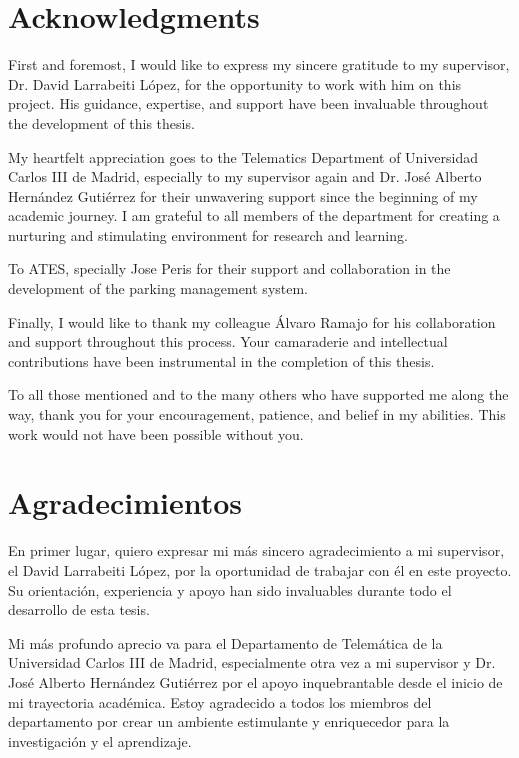 \documentclass[oneside, 12pt, a4paper]{book}
\begin{document}
\blankpage%

\chapter*{Acknowledgments}
\begingroup
\let\clearpage\relax %

First and foremost, I would like to express my sincere gratitude to my supervisor, Dr. David Larrabeiti López, for the opportunity to work with him on this project. His guidance, expertise, and support have been invaluable throughout the development of this thesis.

My heartfelt appreciation goes to the Telematics Department of Universidad Carlos III de Madrid, especially to my supervisor again and Dr. José Alberto Hernández Gutiérrez for their unwavering support since the beginning of my academic journey. I am grateful to all members of the department for creating a nurturing and stimulating environment for research and learning.

To ATES, specially Jose Peris for their support and collaboration in the development of the parking management system.

Finally, I would like to thank my colleague Álvaro Ramajo for his collaboration and support throughout this process. Your camaraderie and intellectual contributions have been instrumental in the completion of this thesis.

To all those mentioned and to the many others who have supported me along the way, thank you for your encouragement, patience, and belief in my abilities. This work would not have been possible without you.

\chapter*{Agradecimientos}

En primer lugar, quiero expresar mi más sincero agradecimiento a mi supervisor, el David Larrabeiti López, por la oportunidad de trabajar con él en este proyecto. Su orientación, experiencia y apoyo han sido invaluables durante todo el desarrollo de esta tesis.

Mi más profundo aprecio va para el Departamento de Telemática de la Universidad Carlos III de Madrid, especialmente otra vez a mi supervisor y Dr. José Alberto Hernández Gutiérrez por el apoyo inquebrantable desde el inicio de mi trayectoria académica. Estoy agradecido a todos los miembros del departamento por crear un ambiente estimulante y enriquecedor para la investigación y el aprendizaje.
\end{document}
